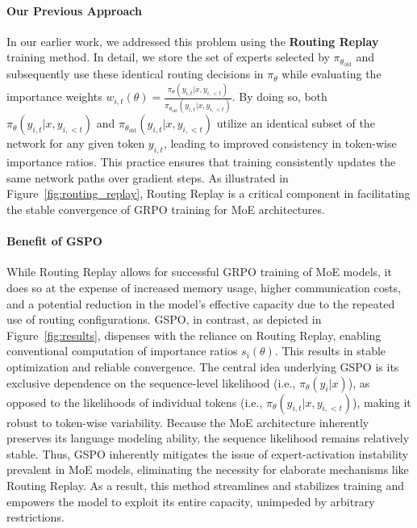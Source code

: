 \paragraph{Our Previous Approach} In our earlier work, we addressed this problem using the \textbf{Routing Replay} training method. In detail, we store the set of experts selected by $\pi_{\theta_\text{old}}$ and subsequently use these identical routing decisions in $\pi_{\theta}$ while evaluating the importance weights $w_{i,t}(\theta) = \frac{ \pi_{\theta} (y_{i,t} | x, y_{i,<t}) }{ \pi_{\theta_\text{old}} (y_{i,t} | x,y_{i,<t})}$. By doing so, both $\pi_{\theta} (y_{i,t} | x, y_{i,<t})$ and $\pi_{\theta_\text{old}} (y_{i,t} | x,y_{i,<t})$ utilize an identical subset of the network for any given token $y_{i,t}$, leading to improved consistency in token-wise importance ratios. This practice ensures that training consistently updates the same network paths over gradient steps. As illustrated in Figure~\ref{fig:routing_replay}, Routing Replay is a critical component in facilitating the stable convergence of GRPO training for MoE architectures.

\paragraph{Benefit of GSPO} While Routing Replay allows for successful GRPO training of MoE models, it does so at the expense of increased memory usage, higher communication costs, and a potential reduction in the model's effective capacity due to the repeated use of routing configurations. GSPO, in contrast, as depicted in Figure~\ref{fig:results}, dispenses with the reliance on Routing Replay, enabling conventional computation of importance ratios $s_i(\theta)$. This results in stable optimization and reliable convergence. The central idea underlying GSPO is its exclusive dependence on the sequence-level likelihood (i.e., $\pi_{\theta} (y_i | x)$), as opposed to the likelihoods of individual tokens (i.e., $\pi_{\theta} (y_{i,t} | x, y_{i,<t})$), making it robust to token-wise variability. Because the MoE architecture inherently preserves its language modeling ability, the sequence likelihood remains relatively stable. Thus, GSPO inherently mitigates the issue of expert-activation instability prevalent in MoE models, eliminating the necessity for elaborate mechanisms like Routing Replay. As a result, this method streamlines and stabilizes training and empowers the model to exploit its entire capacity, unimpeded by arbitrary restrictions.

